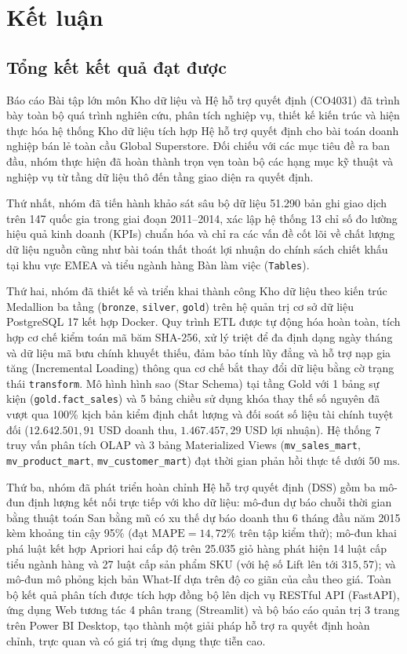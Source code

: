 \section{Kết luận}

\subsection{Tổng kết kết quả đạt được}

Báo cáo Bài tập lớn môn Kho dữ liệu và Hệ hỗ trợ quyết định (CO4031) đã trình bày toàn bộ quá trình nghiên cứu, phân tích nghiệp vụ, thiết kế kiến trúc và hiện thực hóa hệ thống Kho dữ liệu tích hợp Hệ hỗ trợ quyết định cho bài toán doanh nghiệp bán lẻ toàn cầu Global Superstore. Đối chiếu với các mục tiêu đề ra ban đầu, nhóm thực hiện đã hoàn thành trọn vẹn toàn bộ các hạng mục kỹ thuật và nghiệp vụ từ tầng dữ liệu thô đến tầng giao diện ra quyết định.

Thứ nhất, nhóm đã tiến hành khảo sát sâu bộ dữ liệu 51.290 bản ghi giao dịch trên 147 quốc gia trong giai đoạn 2011--2014, xác lập hệ thống 13 chỉ số đo lường hiệu quả kinh doanh (KPIs) chuẩn hóa và chỉ ra các vấn đề cốt lõi về chất lượng dữ liệu nguồn cũng như bài toán thất thoát lợi nhuận do chính sách chiết khấu tại khu vực EMEA và tiểu ngành hàng Bàn làm việc (\texttt{Tables}).

Thứ hai, nhóm đã thiết kế và triển khai thành công Kho dữ liệu theo kiến trúc Medallion ba tầng (\texttt{bronze}, \texttt{silver}, \texttt{gold}) trên hệ quản trị cơ sở dữ liệu PostgreSQL 17 kết hợp Docker. Quy trình ETL được tự động hóa hoàn toàn, tích hợp cơ chế kiểm toán mã băm SHA-256, xử lý triệt để đa định dạng ngày tháng và dữ liệu mã bưu chính khuyết thiếu, đảm bảo tính lũy đẳng và hỗ trợ nạp gia tăng (Incremental Loading) thông qua cơ chế bắt thay đổi dữ liệu bằng cờ trạng thái \texttt{transform}. Mô hình hình sao (Star Schema) tại tầng Gold với 1 bảng sự kiện (\texttt{gold.fact\_sales}) và 5 bảng chiều sử dụng khóa thay thế số nguyên đã vượt qua 100\% kịch bản kiểm định chất lượng và đối soát số liệu tài chính tuyệt đối ($12.642.501,91\text{ USD}$ doanh thu, $1.467.457,29\text{ USD}$ lợi nhuận). Hệ thống 7 truy vấn phân tích OLAP và 3 bảng Materialized Views (\texttt{mv\_sales\_mart}, \texttt{mv\_product\_mart}, \texttt{mv\_customer\_mart}) đạt thời gian phản hồi thực tế dưới $50\text{ ms}$.

Thứ ba, nhóm đã phát triển hoàn chỉnh Hệ hỗ trợ quyết định (DSS) gồm ba mô-đun định lượng kết nối trực tiếp với kho dữ liệu: mô-đun dự báo chuỗi thời gian bằng thuật toán San bằng mũ có xu thế dự báo doanh thu 6 tháng đầu năm 2015 kèm khoảng tin cậy 95\% (đạt $\text{MAPE} = 14,72\%$ trên tập kiểm thử); mô-đun khai phá luật kết hợp Apriori hai cấp độ trên 25.035 giỏ hàng phát hiện 14 luật cấp tiểu ngành hàng và 27 luật cấp sản phẩm SKU (với hệ số Lift lên tới $315,57$); và mô-đun mô phỏng kịch bản What-If dựa trên độ co giãn của cầu theo giá. Toàn bộ kết quả phân tích được tích hợp đồng bộ lên dịch vụ RESTful API (FastAPI), ứng dụng Web tương tác 4 phân trang (Streamlit) và bộ báo cáo quản trị 3 trang trên Power BI Desktop, tạo thành một giải pháp hỗ trợ ra quyết định hoàn chỉnh, trực quan và có giá trị ứng dụng thực tiễn cao.

